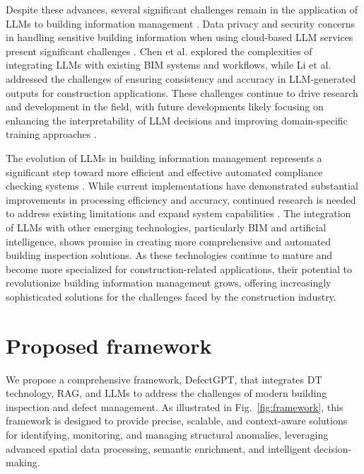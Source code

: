 \documentclass[a4paper,fleqn]{cas-sc}
\begin{document}

Despite these advances, several significant challenges remain in the application of LLMs to building information management \cite{li2023explaining, meng2023self}. Data privacy and security concerns in handling sensitive building information when using cloud-based LLM services present significant challenges \cite{mohammadi2023integration}. Chen et al. \cite{chen2023improving} explored the complexities of integrating LLMs with existing BIM systems and workflows, while Li et al. \cite{li2024single} addressed the challenges of ensuring consistency and accuracy in LLM-generated outputs for construction applications. These challenges continue to drive research and development in the field, with future developments likely focusing on enhancing the interpretability of LLM decisions and improving domain-specific training approaches \cite{fan2023retrieval}.

The evolution of LLMs in building information management represents a significant step toward more efficient and effective automated compliance checking systems \cite{fan2023retrieval}. While current implementations have demonstrated substantial improvements in processing efficiency and accuracy, continued research is needed to address existing limitations and expand system capabilities \cite{borgeaud2022improving, izacard2021leveraging}. The integration of LLMs with other emerging technologies, particularly BIM and artificial intelligence, shows promise in creating more comprehensive and automated building inspection solutions. As these technologies continue to mature and become more specialized for construction-related applications, their potential to revolutionize building information management grows, offering increasingly sophisticated solutions for the challenges faced by the construction industry.

\section{Proposed framework}

We propose a comprehensive framework, DefectGPT, that integrates DT technology, RAG, and LLMs to address the challenges of modern building inspection and defect management. As illustrated in Fig.~\ref{fig:framework}, this framework is designed to provide precise, scalable, and context-aware solutions for identifying, monitoring, and managing structural anomalies, leveraging advanced spatial data processing, semantic enrichment, and intelligent decision-making.
\end{document}
